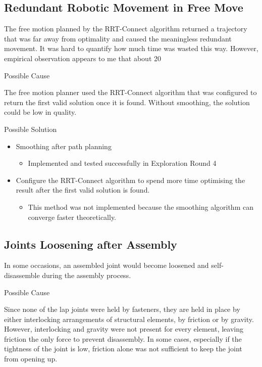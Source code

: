 \subsection{Redundant Robotic Movement in Free Move}
\label{subsection:exploration-2-redundant-robotic-movement-in-free-move}

The free motion planned by the RRT-Connect algorithm returned a trajectory that was far away from optimality and caused the meaningless redundant movement. It was hard to quantify how much time was wasted this way. However, empirical observation appears to me that about 20%

Possible Cause

The free motion planner used the RRT-Connect algorithm that was configured to return the first valid solution once it is found. Without smoothing, the solution could be low in quality.

Possible Solution
\begin{itemize}
    \item Smoothing after path planning
    \begin{itemize}
        \item Implemented and tested successfully in Exploration Round 4 
    \end{itemize}
    \item Configure the RRT-Connect algorithm to spend more time optimising the result after the first valid solution is found.
    \begin{itemize}
        \item This method was not implemented because the smoothing algorithm can converge faster theoretically.
    \end{itemize}
\end{itemize}

\subsection{Joints Loosening after Assembly}
\label{subsection:exploration-2-joints-loosening-after-assembly}

In some occasions, an assembled joint would become loosened and self-disassemble during the assembly process. 

Possible Cause

Since none of the lap joints were held by fasteners, they are held in place by either interlocking arrangements of structural elements, by friction or by gravity. However, interlocking and gravity were not present for every element, leaving friction the only force to prevent disassembly. In some cases, especially if the tightness of the joint is low, friction alone was not sufficient to keep the joint from opening up.

